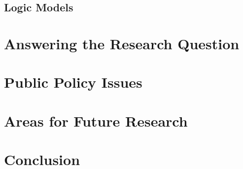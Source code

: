 \subsection{Logic Models}%
\label{sec:logic-models}\indent%

\section{Answering the Research Question}%
\label{sec:answ-rese-quest}\indent%

\section{Public Policy Issues}%
\label{sec:publ-policy-chang}\indent%

\section{Areas for Future Research}%
\label{sec:issu-future-rese}\indent%

\section{Conclusion}%
\label{sec:conclusion}\indent%


